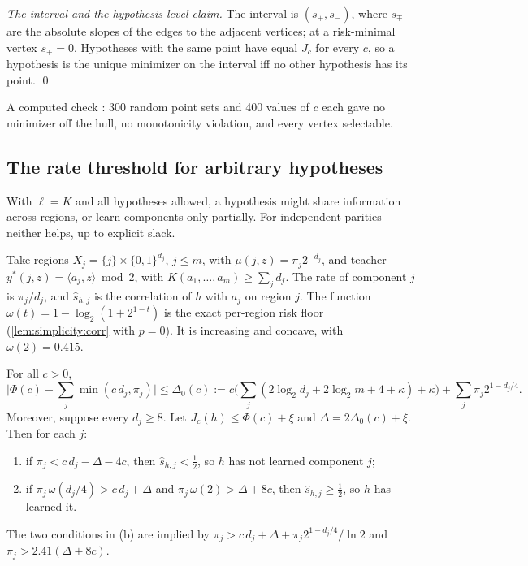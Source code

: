 \emph{The interval and the hypothesis-level claim.} The interval is $(s_+,s_-)$, where $s_\mp$ are the absolute slopes of the edges to the adjacent vertices; at a risk-minimal vertex $s_+=0$. Hypotheses with the same point have equal $J_c$ for every $c$, so a hypothesis is the unique minimizer on the interval iff no other hypothesis has its point.
\qed

\smallskip
\noindent A computed check : 300 random point sets and 400 values of $c$ each gave no minimizer off the hull, no monotonicity violation, and every vertex selectable.

\subsection{The rate threshold for arbitrary hypotheses}\label{app:simplicity:idealized}

With $\ell=K$ and all hypotheses allowed, a hypothesis might share information across regions, or learn components only partially. For independent parities neither helps, up to explicit slack.

Take regions $X_j=\{j\}\times\{0,1\}^{d_j}$, $j\le m$, with $\mu(j,z)=\pi_j2^{-d_j}$, and teacher $y^*(j,z)=\langle a_j,z\rangle\bmod2$, with $K(a_1,\dots,a_m)\ge\sum_jd_j$. The rate of component $j$ is $\pi_j/d_j$, and $\hat s_{h,j}$ is the correlation of $h$ with $a_j$ on region $j$. The function $\omega(t)=1-\log_2(1+2^{1-t})$ is the exact per-region risk floor (\cref{lem:simplicity:corr} with $p=0$). It is increasing and concave, with $\omega(2)=0.415$.

\begin{theorem}\label{thm:simplicity:idealized}
For all $c>0$,
\[
\Big|\Phi(c)-\sum_j\min(c\,d_j,\pi_j)\Big|\le\Delta_0(c):=c\Big(\sum_j(2\log_2d_j+2\log_2m+4+\kappa)+\kappa\Big)+\sum_j\pi_j2^{1-d_j/4}.
\]
Moreover, suppose every $d_j\ge8$. Let $J_c(h)\le\Phi(c)+\xi$ and $\Delta=2\Delta_0(c)+\xi$. Then for each $j$:
\begin{enumerate}[label=(\alph*)]
\item if $\pi_j<c\,d_j-\Delta-4c$, then $\hat s_{h,j}<\frac12$, so $h$ has not learned component $j$;
\item if $\pi_j\,\omega(d_j/4)>c\,d_j+\Delta$ and $\pi_j\,\omega(2)>\Delta+8c$, then $\hat s_{h,j}\ge\frac12$, so $h$ has learned it.
\end{enumerate}
The two conditions in (b) are implied by $\pi_j>c\,d_j+\Delta+\pi_j2^{1-d_j/4}/\ln2$ and $\pi_j>2.41(\Delta+8c)$.
\end{theorem}

